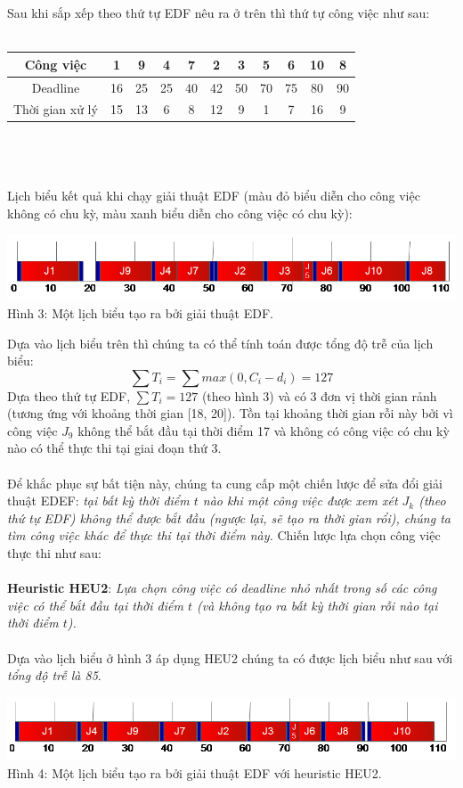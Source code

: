 \documentclass[a4paper,12pt]{article}
\begin{document}
Sau khi sắp xếp theo thứ tự EDF nêu ra ở trên thì thứ tự công việc như sau:\\\\
\begin{tabular}{|c|c|c|c|c|c|c|c|c|c|c|}
\hline
Công việc&1&9&4&7&2&3&5&6&10&8\\
\hline
Deadline&16&25&25&40&42&50&70&75&80&90\\
\hline
Thời gian xử lý&15&13&6&8&12&9&1&7&16&9\\
\hline
\end{tabular}
\\\\\\
Lịch biểu kết quả khi chạy giải thuật EDF (màu đỏ biểu diễn cho công việc không có chu kỳ, màu xanh biểu diễn cho công việc có chu kỳ):
\begin{center}
\includegraphics[scale=0.7]{Fig_3.png}
\\
Hình 3: Một lịch biểu tạo ra bởi giải thuật EDF.
\end{center}
Dựa vào lịch biểu trên thì chúng ta có thể tính toán được tổng độ trễ của lịch biểu:
\[
\sum T_i = \sum max(0, C_i - d_i) = 127
\]
Dựa theo thứ tự EDF, $\sum T_i = 127$ (theo hình 3) và có 3 đơn vị thời gian rảnh (tương ứng với khoảng thời gian [18, 20]). Tồn tại khoảng thời gian rỗi này bởi vì công việc $J_9$ không thể bắt đầu tại thời điểm 17 và không có công việc có chu kỳ nào có thể thực thi tại giai đoạn thứ 3.\\\\
Để khắc phục sự bất tiện này, chúng ta cung cấp một chiến lược để sửa đổi giải thuật EDEF: \textit{tại bất kỳ thời điểm $t$ nào khi một công việc được xem xét $J_k$ (theo thứ tự EDF) không thể được bắt đầu (ngược lại, sẽ tạo ra thời gian rổi), chúng ta tìm công việc khác để thực thi tại thời điểm này.} Chiến lược lựa chọn công việc thực thi như sau:\\\\
\textbf{Heuristic HEU2}: \textit{Lựa chọn công việc có deadline nhỏ nhất trong số các công việc có thể bắt đầu tại thời điểm $t$ (và không tạo ra bất kỳ thời gian rỗi nào tại thời điểm $t$).}\\\\
Dựa vào lịch biểu ở hình 3 áp dụng HEU2 chúng ta có được lịch biểu như sau với \textit{tổng độ trễ là 85}.
\begin{center}
\includegraphics[scale=0.7]{Fig_4.png}
\\
Hình 4: Một lịch biểu tạo ra bởi giải thuật EDF với heuristic HEU2.
\end{center}
\end{document}
